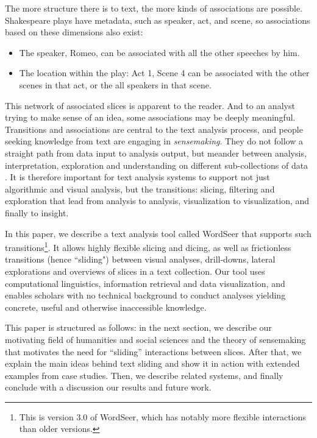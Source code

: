\documentclass{sig-alternate}
\begin{document}
The more structure there is to text, the more kinds of associations are possible. Shakespeare plays have metadata, such as speaker, act, and scene, so associations based on these dimensions also exist:
\begin{itemize}
\item The speaker, Romeo, can be associated with all the other speeches by him.
\item The location within the play: Act 1, Scene 4 can be associated with the other scenes in that act, or the all speakers in that scene.
\end{itemize}

This network of associated slices is apparent to the reader. And to an analyst trying to make sense of an idea, some associations may be deeply meaningful.  Transitions  and associations are central to the text analysis process, and people seeking knowledge from text are engaging in \emph{sensemaking}. They do not follow a straight path from data input to analysis output, but meander between analysis, interpretation, exploration and understanding on different sub-collections of data \cite{russell_cost_1993, russell_being_2006, pirolli_sensemaking_2005}.  It is therefore important for text analysis systems to support not just algorithmic and visual analysis, but the transitions: slicing, filtering and exploration that lead from analysis to analysis, visualization to visualization, and finally to insight.

In this paper, we describe a text analysis tool called WordSeer that supports such transitions\footnote{This is version 3.0 of WordSeer, which has notably more flexible interactions than older versions.}.  It allows highly flexible slicing and dicing, as well as frictionless transitions (hence ``sliding") between visual analyses, drill-downs, lateral explorations and overviews of slices in a text collection. Our tool uses computational linguistics, information retrieval and data visualization, and enables scholars with no technical background to conduct analyses yielding concrete, useful and otherwise inaccessible knowledge. 

This paper is structured as follows: in the next section, we describe our motivating field of humanities and social sciences and the theory of sensemaking that motivates the need for ``sliding'' interactions between slices. After that, we explain the main ideas behind text sliding and show it in action with extended examples from case studies. Then, we describe related systems, and finally conclude with a discussion our results and future work.
\end{document}
